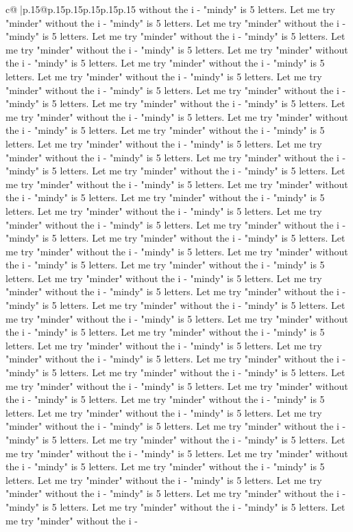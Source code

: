 \documentclass{article}
\begin{document}
{\begin{supertabular}{c@{$\;$}|p{.15\linewidth}@{}p{.15\linewidth}p{.15\linewidth}p{.15\linewidth}p{.15\linewidth}p{.15\linewidth}}
{{{without the i {-} "mindy" is 5 letters. Let me try "minder" without the i {-} "mindy" is 5 letters. Let me try "minder" without the i {-} "mindy" is 5 letters. Let me try "minder" without the i {-} "mindy" is 5 letters. Let me try "minder" without the i {-} "mindy" is 5 letters. Let me try "minder" without the i {-} "mindy" is 5 letters. Let me try "minder" without the i {-} "mindy" is 5 letters. Let me try "minder" without the i {-} "mindy" is 5 letters. Let me try "minder" without the i {-} "mindy" is 5 letters. Let me try "minder" without the i {-} "mindy" is 5 letters. Let me try "minder" without the i {-} "mindy" is 5 letters. Let me try "minder" without the i {-} "mindy" is 5 letters. Let me try "minder" without the i {-} "mindy" is 5 letters. Let me try "minder" without the i {-} "mindy" is 5 letters. Let me try "minder" without the i {-} "mindy" is 5 letters. Let me try "minder" without the i {-} "mindy" is 5 letters. Let me try "minder" without the i {-} "mindy" is 5 letters. Let me try "minder" without the i {-} "mindy" is 5 letters. Let me try "minder" without the i {-} "mindy" is 5 letters. Let me try "minder" without the i {-} "mindy" is 5 letters. Let me try "minder" without the i {-} "mindy" is 5 letters. Let me try "minder" without the i {-} "mindy" is 5 letters. Let me try "minder" without the i {-} "mindy" is 5 letters. Let me try "minder" without the i {-} "mindy" is 5 letters. Let me try "minder" without the i {-} "mindy" is 5 letters. Let me try "minder" without the i {-} "mindy" is 5 letters. Let me try "minder" without the i {-} "mindy" is 5 letters. Let me try "minder" without the i {-} "mindy" is 5 letters. Let me try "minder" without the i {-} "mindy" is 5 letters. Let me try "minder" without the i {-} "mindy" is 5 letters. Let me try "minder" without the i {-} "mindy" is 5 letters. Let me try "minder" without the i {-} "mindy" is 5 letters. Let me try "minder" without the i {-} "mindy" is 5 letters. Let me try "minder" without the i {-} "mindy" is 5 letters. Let me try "minder" without the i {-} "mindy" is 5 letters. Let me try "minder" without the i {-} "mindy" is 5 letters. Let me try "minder" without the i {-} "mindy" is 5 letters. Let me try "minder" without the i {-} "mindy" is 5 letters. Let me try "minder" without the i {-} "mindy" is 5 letters. Let me try "minder" without the i {-} "mindy" is 5 letters. Let me try "minder" without the i {-} "mindy" is 5 letters. Let me try "minder" without the i {-} "mindy" is 5 letters. Let me try "minder" without the i {-} "mindy" is 5 letters. Let me try "minder" without the i {-} "mindy" is 5 letters. Let me try "minder" without the i {-} "mindy" is 5 letters. Let me try "minder" without the i {-} "mindy" is 5 letters. Let me try "minder" without the i {-} "mindy" is 5 letters. Let me try "minder" without the i {-} "mindy" is 5 letters. Let me try "minder" without the i {-} "mindy" is 5 letters. Let me try "minder" without the i {-} "mindy" is 5 letters. Let me try "minder" without the i {-} "mindy" is 5 letters. Let me try "minder" without the i {-} "mindy" is 5 letters. Let me try "minder" without the i {-} "mindy" is 5 letters. Let me try "minder" without the i {-} }}}
\end{supertabular}}
\end{document}
